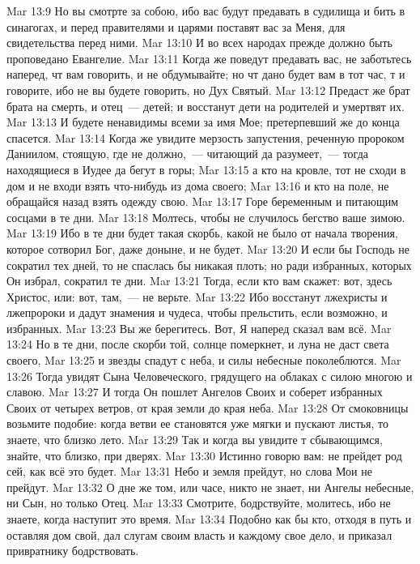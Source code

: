 \vs Mar 13:9 Но вы смотрте за собою, ибо вас будут предавать в судилища и бить в синагогах, и перед правителями и царями поставят вас за Меня, для свидетельства перед ними.
\vs Mar 13:10 И во всех народах прежде должно быть проповедано Евангелие.
\vs Mar 13:11 Когда же поведут предавать вас, не заботьтесь наперед, чт вам говорить, и не обдумывайте; но чт дано будет вам в тот час, т и говорите, ибо не вы будете говорить, но Дух Святый.
\vs Mar 13:12 Предаст же брат брата на смерть, и отец~--- детей; и восстанут дети на родителей и умертвят их.
\vs Mar 13:13 И будете ненавидимы всеми за имя Мое; претерпевший же до конца спасется.
\vs Mar 13:14 Когда же увидите мерзость запустения, реченную пророком Даниилом, стоящую, где не должно,~--- читающий да разумеет,~--- тогда находящиеся в Иудее да бегут в горы;
\vs Mar 13:15 а кто на кровле, тот не сходи в дом и не входи взять что-нибудь из дома своего;
\vs Mar 13:16 и кто на поле, не обращайся назад взять одежду свою.
\vs Mar 13:17 Горе беременным и питающим сосцами в те дни.
\vs Mar 13:18 Молтесь, чтобы не случилось бегство ваше зимою.
\vs Mar 13:19 Ибо в те дни будет такая скорбь, какой не было от начала творения, которое сотворил Бог, даже доныне, и не будет.
\vs Mar 13:20 И если бы Господь не сократил тех дней, то не спаслась бы никакая плоть; но ради избранных, которых Он избрал, сократил те дни.
\vs Mar 13:21 Тогда, если кто вам скажет: вот, здесь Христос, или: вот, там,~--- не верьте.
\vs Mar 13:22 Ибо восстанут лжехристы и лжепророки и дадут знамения и чудеса, чтобы прельстить, если возможно, и избранных.
\vs Mar 13:23 Вы же берегитесь. Вот, Я наперед сказал вам всё.
\vs Mar 13:24 Но в те дни, после скорби той, солнце померкнет, и луна не даст света своего,
\vs Mar 13:25 и звезды спадут с неба, и силы небесные поколеблются.
\vs Mar 13:26 Тогда увидят Сына Человеческого, грядущего на облаках с силою многою и славою.
\vs Mar 13:27 И тогда Он пошлет Ангелов Своих и соберет избранных Своих от четырех ветров, от края земли до края неба.
\vs Mar 13:28 От смоковницы возьмите подобие: когда ветви ее становятся уже мягки и пускают листья, то знаете, что близко лето.
\vs Mar 13:29 Так и когда вы увидите т сбывающимся, знайте, что близко, при дверях.
\vs Mar 13:30 Истинно говорю вам: не прейдет род сей, как всё это будет.
\vs Mar 13:31 Небо и земля прейдут, но слова Мои не прейдут.
\vs Mar 13:32 О дне же том, или часе, никто не знает, ни Ангелы небесные, ни Сын, но только Отец.
\vs Mar 13:33 Смотрите, бодрствуйте, молитесь, ибо не знаете, когда наступит это время.
\vs Mar 13:34 Подобно как бы кто, отходя в путь и оставляя дом свой, дал слугам своим власть и каждому свое дело, и приказал привратнику бодрствовать.
